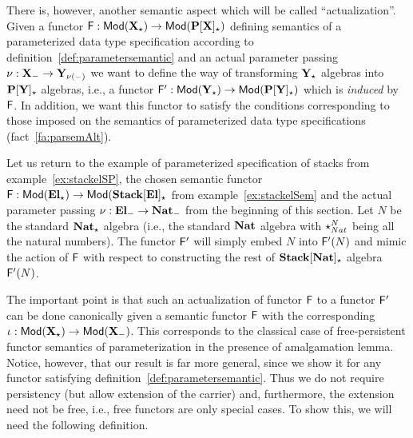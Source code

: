 There is, however, another semantic aspect which will be called ``actualization''.
Given a functor ${\sf {F}}:{\sf {Mod}}({\bf X_\star})\to {\sf {Mod}}({\bf P[X]_\star})$
defining semantics of a parameterized data type specification according to
definition~\ref{def:parametersemantic} and an actual parameter passing
$\nu:{\bf X_-}\to{\bf Y_{\nu(-)}}$ we want to define the way of
transforming ${\bf Y_\star}$ algebras into ${\bf P[Y]_\star}$ algebras, i.e.,
a functor ${\sf {F}}':{\sf {Mod}}({\bf Y_\star})\to {\sf {Mod}}({\bf P[Y]_\star})$ which is
{\em induced} by ${\sf {F}}$. In
addition, we want this functor to satisfy the conditions corresponding to
those imposed on the semantics of parameterized data type specifications (fact~\ref{fa:parsemAlt}).

Let us return to the example of parameterized specification of stacks
from example~\ref{ex:stackelSP}, the chosen semantic functor
${\sf {F}}:{\sf {Mod}}({\bf El_\star})\to{\sf {Mod}}({\bf Stack[El]_\star}$ from 
example~\ref{ex:stackelSem} and the actual parameter passing $\nu:{\bf El_-}\to{\bf Nat_-}$ from the
beginning of this section. Let $N$ be the standard ${\bf Nat_\star}$
algebra (i.e., the standard ${\bf Nat}$ algebra with $\star_{Nat}^N$ being
all the natural numbers). The functor ${\sf {F}}'$ will simply embed $N$ into
${\sf {F}}'(N)$ and mimic the action of ${\sf {F}}$ with respect to constructing
the rest of ${\bf Stack[Nat]_\star}$ algebra ${\sf {F}}'(N)$. 

The important point is that such an actualization of functor ${\sf {F}}$ 
to a functor ${\sf {F}}'$ can be done canonically given a semantic functor
${\sf {F}}$ with the corresponding
$\iota:{\sf {Mod}}({\bf X_\star})\to{\sf {Mod}}({\bf X_-})$.
This corresponds to the classical case of free-persistent functor semantics of
parameterization in the presence of amalgamation lemma. Notice, however, that
our result is far more general, since we show it for any functor satisfying
definition~\ref{def:parametersemantic}. Thus we 
do not require persistency (but
allow extension of the carrier) and, furthermore, the extension need not be
free, i.e., free functors are only special cases. 
To show this, we will need the following definition.

